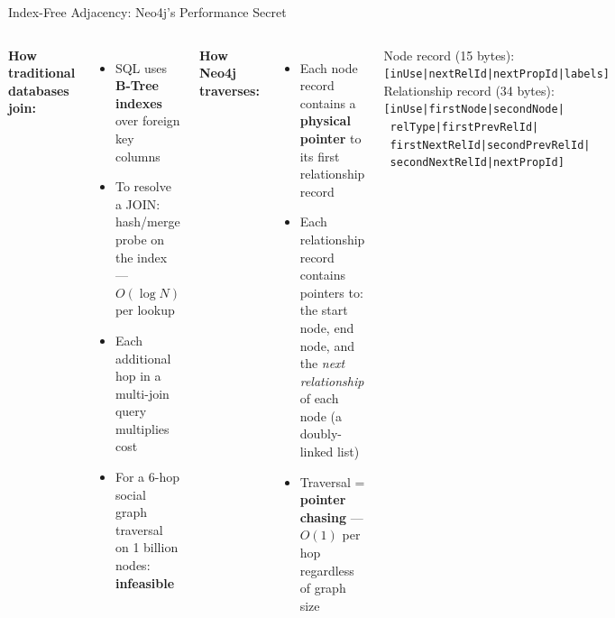 \documentclass[aspectratio=169]{beamer}
\begin{document}
\begin{frame}{Index-Free Adjacency: Neo4j's Performance Secret}
  \begin{columns}[T]
      \textbf{How traditional databases join:}
      \begin{itemize}\small
        \item SQL uses \textbf{B-Tree indexes} over foreign key columns
        \item To resolve a JOIN: hash/merge probe on the index — $O(\log N)$ per lookup
        \item Each additional hop in a multi-join query multiplies cost
        \item For a 6-hop social graph traversal on 1 billion nodes: \textbf{infeasible}
      \end{itemize}
      \vspace{0.3cm}
      \textbf{How Neo4j traverses:}
      \begin{itemize}\small
        \item Each node record contains a \textbf{physical pointer} to its first relationship record
        \item Each relationship record contains pointers to: the start node, end node, and the \textit{next relationship} of each node (a doubly-linked list)
        \item Traversal = \textbf{pointer chasing} — $O(1)$ per hop regardless of graph size
      \end{itemize}
      \begin{tcolorbox}[deepdivebox, title={Deep Dive: Storage Record Layout}]
        \scriptsize
        Node record (15 bytes):
        \vspace{0.1cm}\\
        \texttt{[inUse|nextRelId|nextPropId|labels]}
        \vspace{0.2cm}\\
        Relationship record (34 bytes):
        \vspace{0.1cm}\\
        \texttt{[inUse|firstNode|secondNode|}\\
        \texttt{ relType|firstPrevRelId|}\\
        \texttt{ firstNextRelId|secondPrevRelId|}\\
        \texttt{ secondNextRelId|nextPropId]}
        \vspace{0.2cm}\\

\end{tcolorbox}
\end{columns}
\end{frame}
\end{document}
